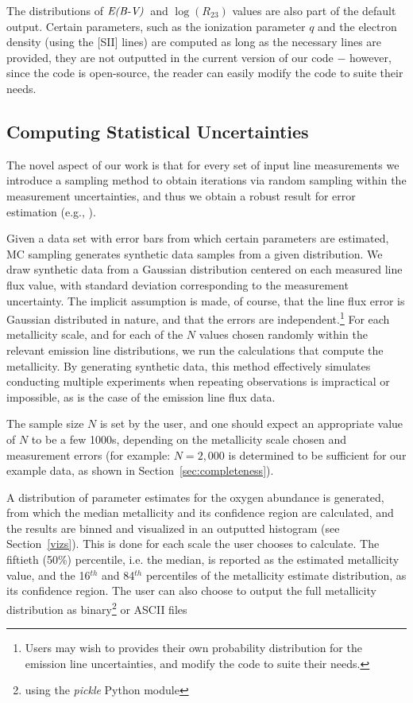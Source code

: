 \documentclass{emulateapj}
\newcommand{\ebmv}{\ensuremath{\mathrm{\emph{E(B-V)}}}}
\begin{document}
The distributions of \ebmv~and $\log(R_{23})$ values are also part of the default output. Certain parameters, such as the ionization parameter $q$ and the electron density (using the [SII] lines) are computed as long as the necessary lines are provided, they are not outputted in the current version of our code $-$ however, since the code is open-source, the reader can easily modify the code to suite their needs.



\subsection{Computing Statistical Uncertainties}\label{sec:uncert}
The novel aspect of our work is that for every set of input line measurements we introduce a sampling method to obtain iterations via random sampling within the measurement uncertainties, and thus we obtain a robust result for error estimation (e.g., \citealt{efron79,hastie09,andrae10}). 

Given a data set with error bars from which certain parameters are estimated, MC sampling generates synthetic data samples from a given distribution. 
We draw synthetic data from a Gaussian distribution centered on each measured line flux value, with standard deviation corresponding to the measurement uncertainty. The implicit assumption is made, of course, that the line flux error is Gaussian distributed in nature, and that the errors are independent.\footnote{Users may wish to provides their own probability distribution for the emission line uncertainties, and modify the code to suite their needs.}
For each metallicity scale, and for each of the $N$ values chosen randomly within the relevant emission line distributions, we run the calculations that compute the metallicity.
By generating synthetic data, this method effectively simulates conducting multiple experiments when repeating observations is impractical or impossible, as is the case of the emission line flux data.

The sample size $N$ is set by the user, and one should expect an appropriate value of $N$ to be a few 1000s, depending on the metallicity scale chosen and measurement errors (for example:  $N=2,000$ is determined to be sufficient for our example data, as shown in Section~\ref{sec:completeness}).

A distribution of parameter estimates for the oxygen abundance is generated, from which the median metallicity and its confidence region are calculated, and the results are binned and visualized in an outputted histogram (see Section~\ref{vizs}). This is done for each scale the user chooses to calculate. The fiftieth (50\%) percentile, i.e.  the median, is reported as the estimated metallicity value, and the 16$^{th}$ and 84$^{th}$ percentiles of the metallicity estimate distribution, as its confidence region. The user can also choose to output the full metallicity distribution as binary\footnote{using the \emph{pickle} Python module} or ASCII files
\end{document}
